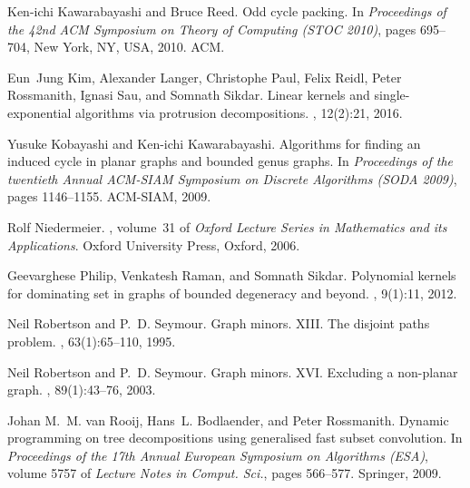 \documentclass[11pt]{article}
\begin{document}
\begin{thebibliography}{10}
Ken-ichi Kawarabayashi and Bruce Reed.
\newblock Odd cycle packing.
\newblock In {\em Proceedings of the 42nd ACM Symposium on Theory of Computing
  (STOC 2010)}, pages 695--704, New York, NY, USA, 2010. ACM.

Eun~Jung Kim, Alexander Langer, Christophe Paul, Felix Reidl, Peter Rossmanith,
  Ignasi Sau, and Somnath Sikdar.
\newblock Linear kernels and single-exponential algorithms via protrusion
  decompositions.
, 12(2):21, 2016.

Yusuke Kobayashi and Ken-ichi Kawarabayashi.
\newblock Algorithms for finding an induced cycle in planar graphs and bounded
  genus graphs.
\newblock In {\em Proceedings of the twentieth Annual ACM-SIAM Symposium on
  Discrete Algorithms (SODA 2009)}, pages 1146--1155. ACM-SIAM, 2009.

Rolf Niedermeier.
, volume~31 of {\em
  Oxford Lecture Series in Mathematics and its Applications}.
\newblock Oxford University Press, Oxford, 2006.

Geevarghese Philip, Venkatesh Raman, and Somnath Sikdar.
\newblock Polynomial kernels for dominating set in graphs of bounded degeneracy
  and beyond.
, 9(1):11, 2012.

Neil Robertson and P.~D. Seymour.
\newblock Graph minors. {XIII}. {T}he disjoint paths problem.
, 63(1):65--110, 1995.

Neil Robertson and P.~D. Seymour.
\newblock Graph minors. {XVI}. {E}xcluding a non-planar graph.
, 89(1):43--76, 2003.

Johan M.~M. van Rooij, Hans~L. Bodlaender, and Peter Rossmanith.
\newblock Dynamic programming on tree decompositions using generalised fast
  subset convolution.
\newblock In {\em Proceedings of the 17th Annual European Symposium on
  Algorithms (ESA)}, volume 5757 of {\em Lecture Notes in Comput. Sci.}, pages
  566--577. Springer, 2009.

\end{thebibliography}
\end{document}
